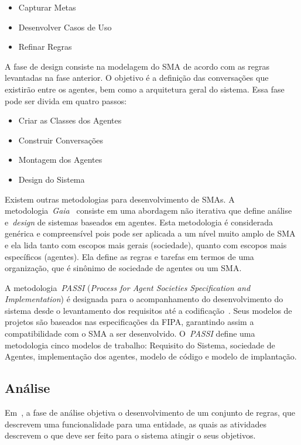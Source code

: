 \begin{itemize}
	\item Capturar Metas
	\item Desenvolver Casos de Uso
	\item Refinar Regras
\end{itemize}

A fase de design consiste na modelagem do SMA de acordo com as regras levantadas na fase anterior. O objetivo é a definição das conversações que existirão entre os agentes, bem como a arquitetura geral do sistema. Essa fase pode ser divida em quatro passos:

\begin{itemize}
	\item Criar as Classes dos Agentes
	\item Construir Conversações
	\item Montagem dos Agentes
	\item Design do Sistema
\end{itemize}

Existem outras metodologias para desenvolvimento de SMAs. A metodologia~\emph{Gaia}~\cite{wooldridge2000} consiste em uma abordagem não iterativa que define análise e~\emph{design} de sistemas baseados em agentes. Esta metodologia é considerada genérica e compreensível pois pode ser aplicada a um nível muito amplo de SMA e ela lida tanto com escopos mais gerais (sociedade), quanto com escopos mais específicos (agentes). Ela define as regras e tarefas em termos de uma organização, que é sinônimo de sociedade de agentes ou um SMA.

A metodologia~\emph{PASSI} (\emph{Process for Agent Societies Specification and Implementation}) é designada para o acompanhamento do desenvolvimento do sistema desde o levantamento dos requisitos até a codificação~\cite{burrafato02}. Seus modelos de projetos são baseados nas especificações da FIPA, garantindo assim a compatibilidade com o SMA a ser desenvolvido. O~\emph{PASSI} define uma metodologia cinco modelos de trabalho: Requisito do Sistema, sociedade de Agentes, implementação dos agentes, modelo de código e modelo de implantação.

\subsection{Análise}

Em~\cite{scott01}, a fase de análise objetiva o desenvolvimento de um conjunto de regras, que descrevem uma funcionalidade para uma entidade, as quais as atividades descrevem o que deve ser feito para o sistema atingir o seus objetivos.


